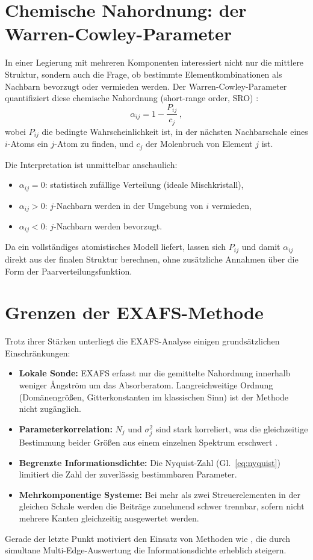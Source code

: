 \section{Chemische Nahordnung: der Warren-Cowley-Parameter}
\label{sec:sro}

In einer Legierung mit mehreren Komponenten interessiert nicht nur die
mittlere Struktur, sondern auch die Frage, ob bestimmte
Elementkombinationen als Nachbarn bevorzugt oder vermieden werden.
Der Warren-Cowley-Parameter quantifiziert diese chemische Nahordnung
(short-range order, SRO) \cite{Warren1969, Cowley1950}:
\begin{equation}
  \alpha_{ij} = 1 - \frac{P_{ij}}{c_j}\,,
  \label{eq:warren_cowley}
\end{equation}
wobei $P_{ij}$ die bedingte Wahrscheinlichkeit ist, in der nächsten
Nachbarschale eines $i$-Atoms ein $j$-Atom zu finden, und $c_j$ der
Molenbruch von Element $j$ ist.

Die Interpretation ist unmittelbar anschaulich:
\begin{itemize}[nosep]
  \item $\alpha_{ij} = 0$: statistisch zufällige Verteilung (ideale Mischkristall),
  \item $\alpha_{ij} > 0$: $j$-Nachbarn werden in der Umgebung von $i$ vermieden,
  \item $\alpha_{ij} < 0$: $j$-Nachbarn werden bevorzugt.
\end{itemize}

Da \evax{} ein vollständiges atomistisches Modell liefert, lassen sich
$P_{ij}$ und damit $\alpha_{ij}$ direkt aus der finalen Struktur
berechnen, ohne zusätzliche Annahmen über die Form der
Paarverteilungsfunktion.

\section{Grenzen der EXAFS-Methode}

Trotz ihrer Stärken unterliegt die EXAFS-Analyse einigen
grundsätzlichen Einschränkungen:
\begin{itemize}
  \item \textbf{Lokale Sonde:} EXAFS erfasst nur die gemittelte
        Nahordnung innerhalb weniger Ångström um das Absorberatom.
        Langreichweitige Ordnung (Domänengrößen, Gitterkonstanten im
        klassischen Sinn) ist der Methode nicht zugänglich.
  \item \textbf{Parameterkorrelation:} $N_j$ und $\sigma_j^2$ sind
        stark korreliert, was die gleichzeitige Bestimmung beider Größen
        aus einem einzelnen Spektrum erschwert \cite{Bunker2010}.
  \item \textbf{Begrenzte Informationsdichte:} Die Nyquist-Zahl
        (Gl.~\eqref{eq:nyquist}) limitiert die Zahl der zuverlässig
        bestimmbaren Parameter.
  \item \textbf{Mehrkomponentige Systeme:} Bei mehr als zwei
        Streuerelementen in der gleichen Schale werden die Beiträge
        zunehmend schwer trennbar, sofern nicht mehrere Kanten
        gleichzeitig ausgewertet werden.
\end{itemize}

Gerade der letzte Punkt motiviert den Einsatz von Methoden wie \evax{},
die durch simultane Multi-Edge-Auswertung die Informationsdichte
erheblich steigern.

